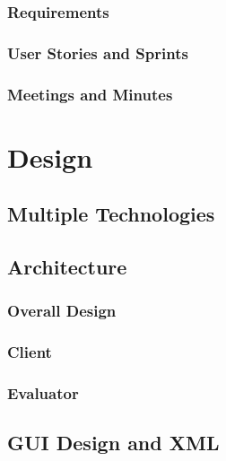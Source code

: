 \documentclass{l4proj}
\begin{document}
\subsection{Requirements}


\subsection{User Stories and Sprints}


\subsection{Meetings and Minutes}


\chapter{Design}

\section{Multiple Technologies}



\section{Architecture}

\subsection{Overall Design}


\subsection{Client}


\subsection{Evaluator}


\section{GUI Design and XML}

\end{document}
